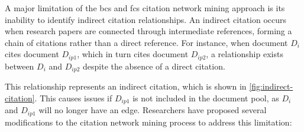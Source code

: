 \documentclass[10pt,oneside]{book}
\begin{document}
A major limitation of the \gls*{bcs} and \gls*{fcs} citation network mining approach is its inability to identify indirect citation relationships. An indirect citation occurs when research papers are connected through intermediate references, forming a chain of citations rather than a direct reference. For instance, when document $D_i$ cites document $D_{ip1}$, which in turn cites document $D_{ip2}$, a relationship exists between $D_i$ and $D_{ip2}$ despite the absence of a direct citation. 

This relationship represents an indirect citation, which is shown in \ref{fig:indirect-citation}. This causes issues if $D_{ip1}$ is not included in the document pool, as $D_i$ and $D_{ip1}$ will no longer have an edge. Researchers have proposed several modifications to the citation network mining process to
address this limitation:

\begin{center}

    \label{fig:indirect-citation}
    \end{center}
\end{document}
